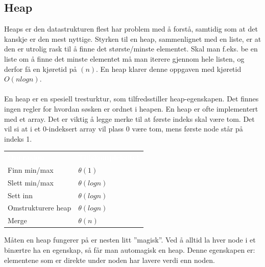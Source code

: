 \subsection{Heap}
Heaps er den datastrukturen flest har problem med å forstå, samtidig som at det kanskje er den mest nyttige. Styrken til en heap, sammenlignet med en liste, er at den er utrolig rask til å finne det største/minste elementet. Skal man f.eks. be en liste om å finne det minste elementet må man iterere gjennom hele listen, og derfor få en kjøretid på $(n)$. En heap klarer denne oppgaven med kjøretid $O(n log n)$. 
\\\\
En heap er en spesiell tresturktur, som tilfredsstiller heap-egenskapen. Det finnes ingen regler for hvordan søsken er ordnet i heapen. En heap er ofte implementert med et array. Det er viktig å legge merke til at første indeks skal være tom. Det vil si at i et 0-indeksert array vil plass 0 være tom, mens første node står på indeks 1.

\begin{table}[H]
    \label{tab:datastrukturer}
    \centering
    \begin{tabular}{|L{15em} | L{15em}|}
        \hline
        \textbf{\textcolor{white}{Operasjon}} & \textbf{\textcolor{white}{ Tidskompleksitet}}\\
        Finn min/max & $\theta(1)$\\
        Slett min/max & $\theta(log n)$\\
        Sett inn & $\theta(log n)$\\
        Omstrukturere heap & $\theta(log n)$\\
        Merge & $\theta(n)$\\
         \hline
    \end{tabular}
\end{table}

\noindent Måten en heap fungerer på er nesten litt ”magisk”. Ved å alltid la hver node i et binærtre ha en egenskap, så får man automagisk en heap. Denne egenskapen er: elementene som er direkte under noden har lavere verdi enn noden.

